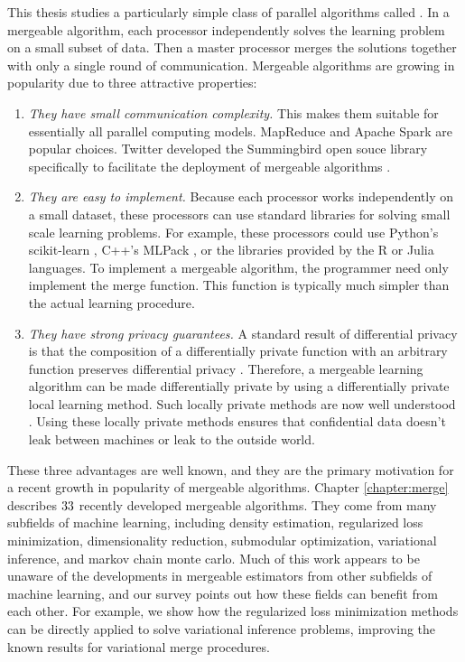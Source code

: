 \documentclass[thesis.tex]{subfiles}
\begin{document}
This thesis studies a particularly simple class of parallel algorithms called .
In a mergeable algorithm,
each processor independently solves the learning problem on a small subset of data.
Then a master processor merges the solutions together with only a single round of communication.
Mergeable algorithms are growing in popularity due to three attractive properties:
\begin{enumerate}
    \item
        \emph{They have small communication complexity.}
    This makes them suitable for essentially all parallel computing models.
    MapReduce \citep{dean2008mapreduce} and Apache Spark \citep{meng2016mllib} are popular choices.
    Twitter developed the Summingbird open souce library specifically to facilitate the deployment of mergeable algorithms \citep{boykin2014summingbird}.
    \item
        \emph{They are easy to implement. }
    Because each processor works independently on a small dataset,
    these processors can use standard libraries for solving small scale learning problems. 
    For example, these processors could use Python's scikit-learn \citep{scikit-learn},
    C++'s MLPack \citep{curtin2013mlpack},
    or the libraries provided by the R \citep{R} or Julia \citep{bezanson2017julia} languages.
    To implement a mergeable algorithm, the programmer need only implement the merge function.
    This function is typically much simpler than the actual learning procedure.
    \item
        \emph{They have strong privacy guarantees.}
    A standard result of differential privacy is that the composition of a differentially private function with an arbitrary function preserves differential privacy \citep{dwork2014algorithmic}.
    Therefore, a mergeable learning algorithm can be made differentially private by using a differentially private local learning method.
    Such locally private methods are now well understood \citep{chaudhuri2011differentially}.
    Using these locally private methods ensures that confidential data doesn't leak between machines or leak to the outside world.
\end{enumerate}
These three advantages are well known,
and they are the primary motivation for a recent growth in popularity of mergeable algorithms.
Chapter \ref{chapter:merge} describes $33$ recently developed mergeable algorithms.
They come from many subfields of machine learning, including
density estimation, regularized loss minimization, dimensionality reduction, submodular optimization, variational inference, and markov chain monte carlo.
Much of this work appears to be unaware of the developments in mergeable estimators from other subfields of machine learning,
and our survey points out how these fields can benefit from each other.
For example, we show how the regularized loss minimization methods can be directly applied to solve variational inference problems,
improving the known results for variational merge procedures.
\end{document}
